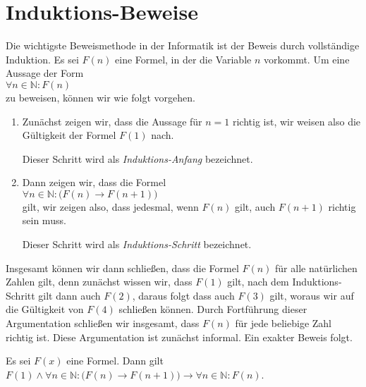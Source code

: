 \section{Induktions-Beweise}
Die wichtigste Beweismethode in der Informatik ist der Beweis durch vollständige Induktion. Es sei
$F(n)$ eine Formel, in der die Variable $n$ vorkommt.  Um eine Aussage der Form
\\[0.2cm]
\hspace*{1.3cm}
$\forall n \in \mathbb{N}: F(n)$
\\[0.2cm]
zu beweisen, können wir wie folgt vorgehen.
\begin{enumerate}
\item Zunächst zeigen wir, dass die Aussage für $n=1$ richtig ist, wir weisen also die Gültigkeit der
      Formel $F(1)$ nach.

      Dieser Schritt wird als \emph{Induktions-Anfang} bezeichnet.
\item Dann zeigen wir, dass die Formel
      \\[0.2cm]
      \hspace*{1.3cm}
      $\forall n \in \mathbb{N} : \bigl( F(n) \rightarrow F(n+1)\bigr)$
      \\[0.2cm]
      gilt, wir zeigen also, dass jedesmal, wenn $F(n)$ gilt, auch $F(n+1)$ richtig sein muss.

      Dieser Schritt wird als \emph{Induktions-Schritt} bezeichnet.
\end{enumerate}
Insgesamt können wir dann schließen, dass die Formel $F(n)$ für alle natürlichen Zahlen gilt, denn
zunächst wissen wir, dass $F(1)$ gilt, nach dem Induktions-Schritt gilt dann auch $F(2)$, daraus folgt
dass auch $F(3)$ gilt, woraus wir auf die Gültigkeit von $F(4)$ schließen können.  Durch Fortführung
dieser Argumentation schließen wir insgesamt, dass $F(n)$ für jede beliebige Zahl richtig ist.  Diese
Argumentation ist zunächst informal. Ein exakter Beweis folgt.

\begin{Satz}
  Es sei $F(x)$ eine Formel. Dann gilt
  \\[0.2cm]
  \hspace*{1.3cm}
  $F(1) \wedge \forall n \in \mathbb{N}:\bigl(F(n) \rightarrow F(n+1)\bigr) \rightarrow 
   \forall n \in \mathbb{N}: F(n)
  $.
\end{Satz}

